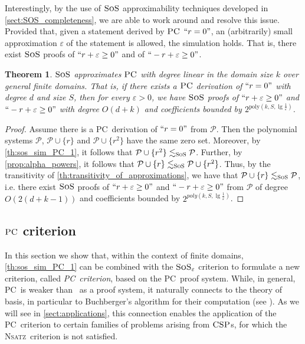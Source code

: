 \documentclass[11pt]{article}
\newcommand{\sos}{\text{\sc{SoS}}}
\newcommand{\CSP}{\textsc{CSP}}
\newcommand{\PC}{\textsc{PC}}
\newcommand{\Nsatz}{\textsc{Nsatz}}
\newcommand{\1}{\textbf{1}}
\newcommand{\GB}{\text{Gr\"{o}bner} }
\newtheorem{theorem}{Theorem}[section]
\begin{document}
Interestingly, by the use of $\sos$ approximability techniques developed in \cref{sect:SOS_completeness}, we are able to work around and resolve this issue. Provided that, given a statement derived by $\PC$ $``r = 0"$, an (arbitrarily) small approximation $\varepsilon$ of the statement is allowed, the simulation holds. That is, there exist $\sos$ proofs of $`` r + \varepsilon \geq 0"$ and of $``- r + \varepsilon \geq 0"$.

\begin{theorem}\label{th:sospc}
    $\sos$ \emph{approximates} $\PC$ with degree linear in the domain size $k$ over general finite domains. That is, if there exists a \(\PC\) derivation of \( ``r=0" \) with degree \( d \) and size \( S \), then for every \( \varepsilon > 0 \), we have \(\sos\) proofs of \( ``r+\varepsilon \geq 0" \) and \( ``-r+\varepsilon \geq 0" \) with degree \( O(d+k) \) and coefficients bounded by \( 2^{\text{poly}(k, S, \lg \frac{1}{\varepsilon})} \).
\end{theorem}

\begin{proof}
    Assume there is a \PC\ derivation of $``r=0"$ from $\mathcal{P}$. Then the polynomial systems $\mathcal{P}$, $\mathcal{P}\cup\{r\}$ and $\mathcal{P}\cup\{r^2\}$ have the same zero set. Moreover, by \cref{th:sos_sim_PC_1}, it follows that $\mathcal{P}\cup \{r^2\} \lesssim_{\sos} \mathcal{P}$. Further, by \cref{prop:alpha_powers}, it follows that $\mathcal{P}\cup \{r\} \lesssim_{\sos}\mathcal{P}\cup \{r^2\}$. Thus, by the transitivity of \cref{th:transitivity_of_approximations}, we have that $\mathcal{P}\cup \{r\} \lesssim_{\sos} \mathcal{P}$, i.e. there exist $\sos$ proofs of $``r+\varepsilon\geq 0"$ and $``-r+\varepsilon\geq 0"$ from $\mathcal{P}$ of degree $O(2(d+k-1))$ and coefficients bounded by $2^{poly(k, S, \lg \frac{1}{\varepsilon})}$.
\end{proof}

\subsection[PC criterion]{$\PC$ criterion}\label{sect:pc_crit}

In this section we show that, within the context of finite domains, \cref{th:sos_sim_PC_1} can be combined with the $\sos_{\varepsilon}$ criterion to formulate a new criterion, called \emph{\PC\ criterion}, based on the \PC\ proof system. 
While, in general, \PC\ is weaker than \sos\ as a proof system, it naturally connects to the theory of \GB basis, in particular to Buchberger's algorithm for their computation (see \cite{BuchbergerThesis}).
As we will see in \cref{sect:applications}, this connection enables the application of the \PC\ criterion to certain families of problems arising from $\CSP$s, for which the \Nsatz\ criterion is not satisfied.
\end{document}
